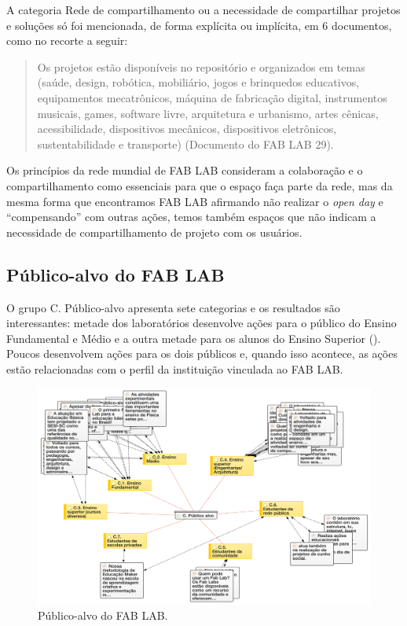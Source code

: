 \documentclass[portuguese]{textolivre}
\begin{document}
A categoria Rede de compartilhamento ou a necessidade de compartilhar projetos e soluções só foi mencionada, de forma explícita ou implícita, em 6 documentos, como no recorte a seguir:

\begin{quote}
    Os projetos estão disponíveis no repositório e organizados em temas (saúde, design, robótica, mobiliário, jogos e brinquedos educativos, equipamentos mecatrônicos, máquina de fabricação digital, instrumentos musicais, games, software livre, arquitetura e urbanismo, artes cênicas, acessibilidade, dispositivos mecânicos, dispositivos eletrônicos, sustentabilidade e transporte) (Documento do FAB LAB 29).
\end{quote}

Os princípios da rede mundial de FAB LAB consideram a colaboração e o compartilhamento como essenciais para que o espaço faça parte da rede, mas da mesma forma que encontramos FAB LAB afirmando não realizar o \textit{open day} e ``compensando'' com outras ações, temos também espaços que não indicam a necessidade de compartilhamento de projeto com os usuários.

\subsection{Público-alvo do FAB LAB}\label{sec-organizacao}
O grupo C. Público-alvo apresenta sete categorias e os resultados são interessantes: metade dos laboratórios desenvolve ações para o público do Ensino Fundamental e Médio e a outra metade para os alunos do Ensino Superior (). Poucos desenvolvem ações para os dois públicos e, quando isso acontece, as ações estão relacionadas com o perfil da instituição vinculada ao FAB LAB.

\begin{figure}[htbp]
\centering
\begin{minipage}{\textwidth}
\includegraphics[width=\linewidth]{Fig5.png}
\caption{Público-alvo do FAB LAB.}
\label{fig5}
\end{minipage}
\end{figure}
\end{document}
